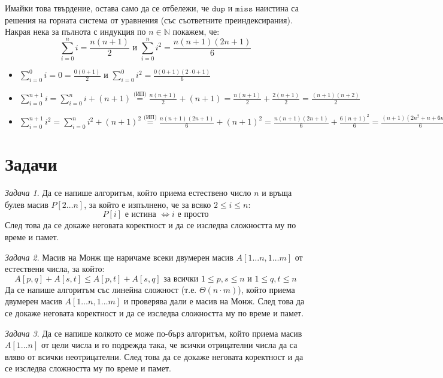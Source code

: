 \documentclass{article}
\theoremstyle{definition}
\theoremstyle{plain}
\theoremstyle{remark}
\newtheorem{problem}{Задача}
\theoremstyle{definition}
\begin{document}
Имайки това твърдение, остава само да се отбележи, че $\mathtt{dup}$ и $\mathtt{miss}$ наистина са решения на горната система от уравнения (със съответните преиндексирания).
Накрая нека за пълнота с индукция по $n \in \mathbb{N}$ покажем, че:
\[
  \sum\limits_{i = 0}^n i = \frac{n(n + 1)}{2} \text{ и } \sum\limits_{i = 0}^n i^2 = \frac{n(n + 1)(2n + 1)}{6}
\]
\begin{itemize}
  \item $\sum\limits_{i = 0}^0 i = 0 = \frac{0(0 + 1)}{2}$ и $\sum\limits_{i = 0}^0 i^2 = \frac{0(0 + 1)(2 \cdot 0 + 1)}{6}$ \checkmark
  \item $\sum\limits_{i = 0}^{n + 1} i = \sum\limits_{i = 0}^{n} i + (n + 1) \stackrel{\text{(ИП)}}{=} \frac{n(n + 1)}{2} + (n + 1) = \frac{n(n + 1)}{2} + \frac{2(n + 1)}{2} = \frac{(n + 1)(n + 2)}{2}$
  \item $\sum\limits_{i = 0}^{n + 1} i^2 = \sum\limits_{i = 0}^{n} i^2 + (n + 1)^2 \stackrel{\text{(ИП)}}{=} \frac{n(n + 1)(2n + 1)}{6} + (n + 1)^2 = \frac{n(n + 1)(2n + 1)}{6} + \frac{6(n + 1)^2}{6} = \frac{(n + 1)(2n^2 + n + 6n + 6)}{6} = \frac{(n + 1)(n + 2)(2(n + 1) + 1)}{6}$
\end{itemize}

\section*{Задачи}

\begin{problem}
Да се напише алгоритъм, който приема естествено число $n$ и връща булев масив $P[2 \dots n]$, за който е изпълнено, че за всяко $2 \leq i \leq n$:
\[
  P[i] \text{ е истина } \iff i \text{ е просто}
\]
След това да се докаже неговата коректност и да се изследва сложността му по време и памет.
\end{problem}

\begin{problem}
Масив на Монж ще наричаме всеки двумерен масив $A[1 \dots n, 1 \dots m]$ от естествени числа, за който:
\[
  A[p, q] + A[s, t] \leq A[p, t] + A[s, q] \text{ за всички } 1 \leq p, s \leq n \text{ и } 1 \leq q, t \leq n
\]
Да се напише алгоритъм със линейна сложност (т.е. $\Theta(n \cdot m)$), който приема двумерен масив $A[1 \dots n, 1 \dots m]$ и проверява дали е масив на Монж.
След това да се докаже неговата коректност и да се изследва сложността му по време и памет.
\end{problem}

\begin{problem}
Да се напише колкото се може по-бърз алгоритъм, който приема масив $A[1 \dots n]$ от цели числа и го подрежда така, че всички отрицателни числа да са вляво от всички неотрицателни.
След това да се докаже неговата коректност и да се изследва сложността му по време и памет.
\end{problem}
\end{document}
